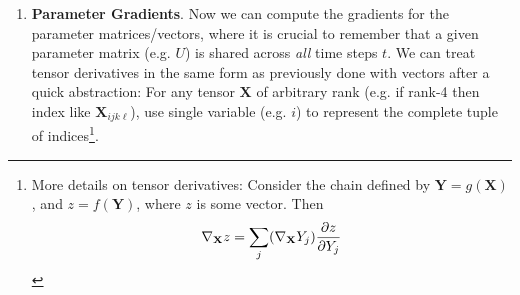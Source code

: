 \documentclass[11pt]{article}
\begin{document}
\begin{enumerate}
\begin{compactitem}
	\end{compactitem}
	
	\item \textbf{Parameter Gradients}. Now we can compute the gradients for the parameter matrices/vectors, where it is crucial to remember that a given parameter matrix (e.g. $U$) is shared across \textit{all} time steps $t$. We can treat tensor derivatives in the same form as previously done with vectors after a quick abstraction: For any tensor $\mathbf{X}$ of arbitrary rank (e.g. if rank-4 then index like $\mathbf{X}_{ijk\ell}$), use single variable (e.g. $i$) to represent the complete tuple of indices\footnote{More details on tensor derivatives: Consider the chain defined by $\mathbf{Y} = g(\mathbf{X})$, and $z = f(\mathbf{Y})$, where $z$ is some vector. Then $$\nabla_{\mathbf{X}} z = \sum_j (\nabla_{\mathbf{X}} Y_j)\frac{\partial z}{\partial Y_j} $$}.
	
\end{enumerate}
\end{document}
